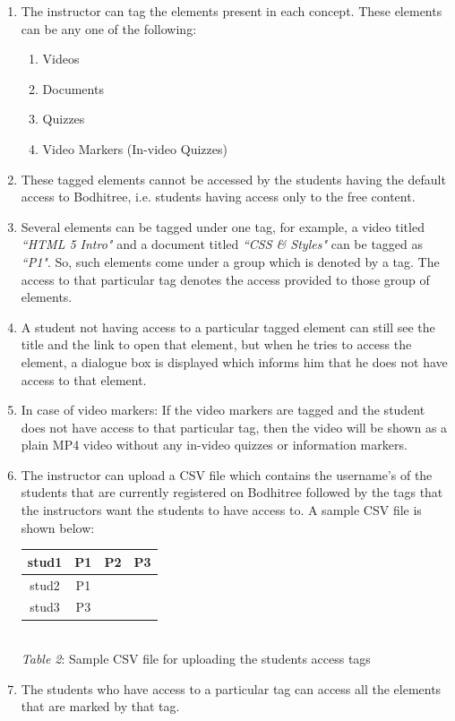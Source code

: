 \begin{enumerate}
	\item The instructor can tag the elements present in each concept. These elements can be any one of the following:
	\begin{enumerate}
		\item Videos
		\item Documents
		\item Quizzes
		\item Video Markers (In-video Quizzes)
	\end{enumerate}
	\item These tagged elements cannot be accessed by the students having the default access to Bodhitree, i.e. students having access only to the free content.
	\item Several elements can be tagged under one tag, for example, a video titled \textit{``HTML 5 Intro"} and a document titled \textit{``CSS \& Styles"} can be tagged as \textit{``P1"}. So, such elements come under a group which is denoted by a tag. The access to that particular tag denotes the access provided to those group of elements.
	\item A student not having access to a particular tagged element can still see the title and the link to open that element, but when he tries to access the element, a dialogue box is displayed which informs him that he does not have access to that element.
	\item In case of video markers: If the video markers are tagged and the student does not have access to that particular tag, then the video will be shown as a plain MP4 video without any in-video quizzes or information markers.
	\item The instructor can upload a CSV file which contains the username's of the students that are currently registered on Bodhitree followed by the tags that the instructors want the students to have access to. A sample CSV file is shown below:
	
	\begin{center}
		\begin{tabular}{|c|c|c|c|}
		\hline \rule[-2ex]{0pt}{5.5ex} stud1 & P1 & P2 & P3 \\ 
		\hline \rule[-2ex]{0pt}{5.5ex} stud2 & P1 &  &  \\ 
		\hline \rule[-2ex]{0pt}{5.5ex} stud3 & P3 &  &  \\ 
		\hline 
		\end{tabular} \\
		\vspace{0.2cm}
		\textit{Table 2}: Sample CSV file for uploading the students access tags
	\end{center}
	
	\item The students who have access to a particular tag can access all the elements that are marked by that tag.
\end{enumerate}

